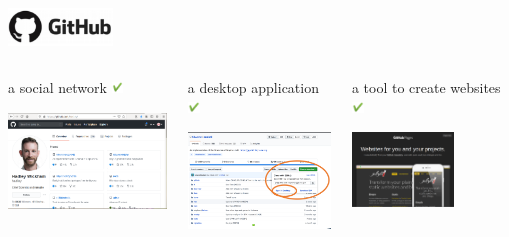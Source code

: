 \begin{frame}[t]{\includegraphics[height=1cm]{shared/logo-github.png}}
\begin{columns}[T]
\begin{block}{a social network \includegraphics[height=0.3cm]{05_history/Images/FAIR_yes.png}}
\begin{center}
\includegraphics[height=2.6cm]{05_history/Images/FAIR_github_exSocialNet.png}
\end{center}
\end{block}
\begin{block}{a desktop application \includegraphics[height=0.3cm]{05_history/Images/FAIR_yes.png}}
\begin{center}
\includegraphics[height=2.6cm]{05_history/Images/FAIR_github_desktop_dl.png}
\end{center}
\end{block}
\begin{block}{a tool to create websites \includegraphics[height=0.3cm]{05_history/Images/FAIR_yes.png}}
\begin{center}
\includegraphics[height=2cm]{05_history/Images/FAIR_github_pages.png}

\end{center}
\end{block}
\end{columns}
\end{frame}
